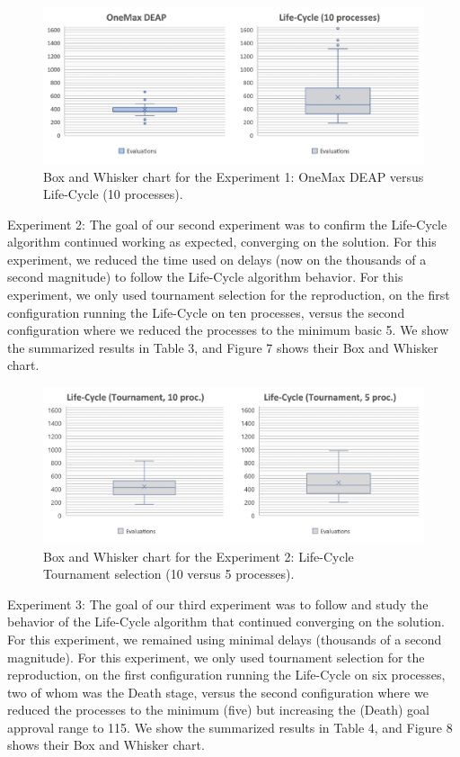 \documentclass[runningheads]{llncs}
\begin{document}
\begin{figure}
    \includegraphics[width=\textwidth]{img/fig6_experiment01_chart.pdf}
    \caption{Box and Whisker chart for the Experiment 1: OneMax DEAP versus Life-Cycle (10 processes).} \label{fig6}
    \end{figure}


Experiment 2: The goal of our second experiment was to confirm the Life-Cycle
algorithm continued working as expected, converging on the solution. For this
experiment, we reduced the time used on delays (now on the thousands of a
second magnitude) to follow the Life-Cycle algorithm behavior. For this
experiment, we only used tournament selection for the reproduction, on the
first configuration running the Life-Cycle on ten processes, versus the second
configuration where we reduced the processes to the minimum basic 5. We show
the summarized results in Table 3, and Figure 7 shows their Box and Whisker
chart.

\begin{figure}
    \includegraphics[width=\textwidth]{img/fig7_experiment02_chart.pdf}
    \caption{Box and Whisker chart for the Experiment 2: Life-Cycle Tournament selection (10 versus 5 processes).} \label{fig7}
    \end{figure}


Experiment 3: The goal of our third experiment was to follow and study the
behavior of the Life-Cycle algorithm that continued converging on the solution.
For this experiment, we remained using minimal delays (thousands of a second
magnitude). For this experiment, we only used tournament selection for the
reproduction, on the first configuration running the Life-Cycle on six
processes, two of whom was the Death stage, versus the second configuration
where we reduced the processes to the minimum (five) but increasing the (Death)
goal approval range to 115. We show the summarized results in Table 4, and
Figure 8 shows their Box and Whisker chart.
\end{document}
